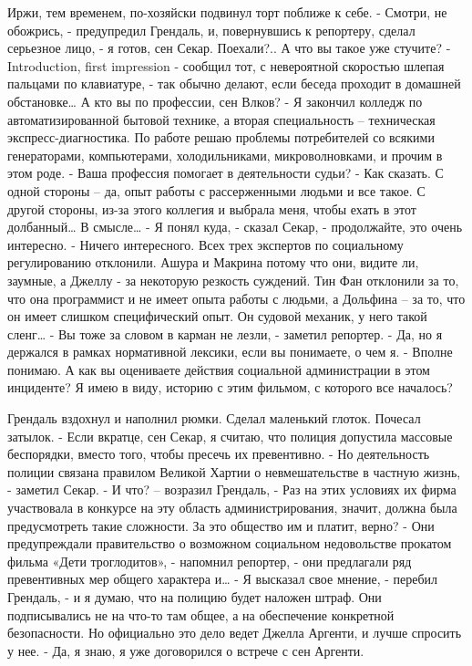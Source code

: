 \documentclass{book}
\begin{document}
Иржи, тем временем, по-хозяйски подвинул торт поближе к себе.
- Смотри, не обожрись, - предупредил Грендаль, и, повернувшись к репортеру, сделал серьезное лицо, - я готов, сен Секар. Поехали?.. А что вы такое уже стучите?
- Introduction, first impression - сообщил тот, с невероятной скоростью шлепая пальцами по клавиатуре, - так обычно делают, если беседа проходит в домашней обстановке\ldots{} А кто вы по профессии, сен Влков?
- Я закончил колледж по автоматизированной бытовой технике, а вторая специальность – техническая экспресс-диагностика. По работе решаю проблемы потребителей со всякими генераторами, компьютерами, холодильниками, микроволновками, и прочим в этом роде.
- Ваша профессия помогает в деятельности судьи?
- Как сказать. С одной стороны – да, опыт работы с рассерженными людьми и все такое. С другой стороны, из-за этого коллегия и выбрала меня, чтобы ехать в этот долбанный\ldots{} В смысле\ldots{}
- Я понял куда, - сказал Секар, - продолжайте, это очень интересно.
- Ничего интересного. Всех трех экспертов по социальному регулированию отклонили. Ашура и Макрина потому что они, видите ли, заумные, а Джеллу - за некоторую резкость суждений. Тин Фан отклонили за то, что она программист и не имеет опыта работы с людьми, а Дольфина – за то, что он имеет слишком специфический опыт. Он судовой механик, у него такой сленг\ldots{}
- Вы тоже за словом в карман не лезли, - заметил репортер.
- Да, но я держался в рамках нормативной лексики, если вы понимаете, о чем я.
- Вполне понимаю. А как вы оцениваете действия социальной администрации в этом инциденте? Я имею в виду, историю с этим фильмом, с которого все началось?

Грендаль вздохнул и наполнил рюмки. Сделал маленький глоток. Почесал затылок.
- Если вкратце, сен Секар, я считаю, что полиция допустила массовые беспорядки, вместо того, чтобы пресечь их превентивно.
- Но деятельность полиции связана правилом Великой Хартии о невмешательстве в частную жизнь, - заметил Секар.
- И что? – возразил Грендаль, - Раз на этих условиях их фирма участвовала в конкурсе на эту область администрирования, значит, должна была предусмотреть такие сложности. За это общество им и платит, верно?
- Они предупреждали правительство о возможном социальном недовольстве прокатом фильма «Дети троглодитов», - напомнил репортер, - они предлагали ряд превентивных мер общего характера и\ldots{}
- Я высказал свое мнение, - перебил Грендаль, - и я думаю, что на полицию будет наложен штраф. Они подписывались не на что-то там общее, а на обеспечение конкретной безопасности. Но официально это дело ведет Джелла Аргенти, и лучше спросить у нее.
- Да, я знаю, я уже договорился о встрече с сен Аргенти.
\end{document}
